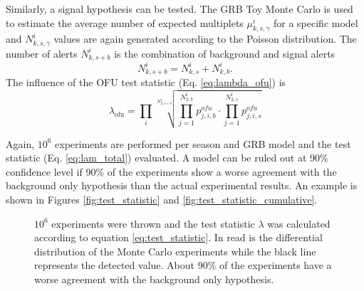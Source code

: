 Similarly, a signal hypothesis can be tested. The GRB Toy Monte Carlo is used 
to estimate the average number of expected multiplets $\mu_{k,s, \gamma}^i$ for 
a 
specific model and $N_{k,s, \gamma}^i$ values are again generated according to 
the 
Poisson  distribution. The number of alerts $N_{k,s+b}^i$ is the
combination of background and signal alerts
\begin{equation}
 N_{k,s+b}^i = N_{k,s}^i + N_{k,b}^i.
\end{equation}
The influence of the OFU test statistic (Eq. \ref{eq:lambda_ofu}) is 
\begin{equation}
 \lambda_\text{ofu} = \prod_i \sqrt[N_{2,s+b}^i]{\prod_{j=1}^{N_{2,b}^i} 
p_{j,i,b}^{ofu} \cdot \prod_{j=1}^{N_{2,s}^i}
p_{j,i,s}^{ofu}}
\end{equation}

Again, $10^6$ experiments are performed per season and GRB 
model and the test statistic (Eq. \ref{eq:lam_total})
evaluated. A model can be ruled 
out at 90\% confidence level if 90\% of the experiments show a worse agreement 
with the background only hypothesis than the actual experimental results.
An example is shown in Figures \ref{fig:test_statistic} and 
\ref{fig:test_statistic_cumulative}.
\begin{figure}[h]
\centering
 \captionsetup{width=.9\textwidth}
\caption{$10^6$ experiments were thrown and the 
test statistic $\lambda$ was calculated according 
to equation \ref{eq:test_statistic}. In read is the differential
distribution of the Monte Carlo experiments while 
the black line represents the detected value. About 90\% of the experiments 
have a worse agreement with the background only hypothesis.}
\end{figure}

